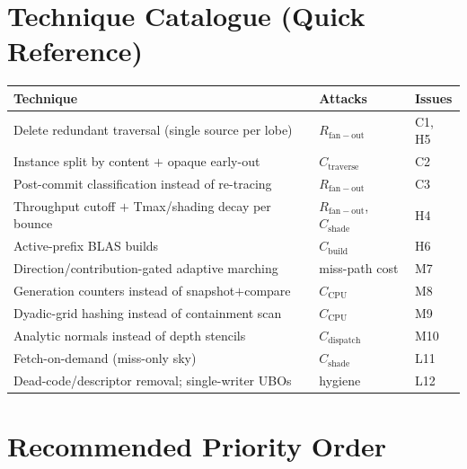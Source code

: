 \documentclass[11pt,a4paper]{article}
\begin{document}
\section{Technique Catalogue (Quick Reference)}

\begin{longtable}{@{}lll@{}}
\toprule
\textbf{Technique} & \textbf{Attacks} & \textbf{Issues} \\
\midrule
Delete redundant traversal (single source per lobe) & $R_{\mathrm{fan-out}}$ & C1, H5 \\
Instance split by content $+$ opaque early-out & $C_{\mathrm{traverse}}$ & C2 \\
Post-commit classification instead of re-tracing & $R_{\mathrm{fan-out}}$ & C3 \\
Throughput cutoff $+$ Tmax/shading decay per bounce & $R_{\mathrm{fan-out}}$, $C_{\mathrm{shade}}$ & H4 \\
Active-prefix BLAS builds & $C_{\mathrm{build}}$ & H6 \\
Direction/contribution-gated adaptive marching & miss-path cost & M7 \\
Generation counters instead of snapshot$+$compare & $C_{\mathrm{CPU}}$ & M8 \\
Dyadic-grid hashing instead of containment scan & $C_{\mathrm{CPU}}$ & M9 \\
Analytic normals instead of depth stencils & $C_{\mathrm{dispatch}}$ & M10 \\
Fetch-on-demand (miss-only sky) & $C_{\mathrm{shade}}$ & L11 \\
Dead-code/descriptor removal; single-writer UBOs & hygiene & L12 \\
\bottomrule
\end{longtable}

\section{Recommended Priority Order}
\end{document}
